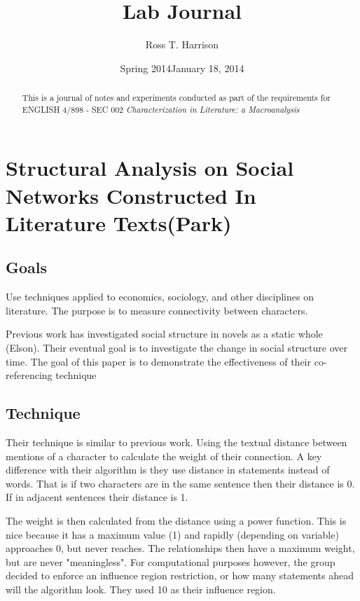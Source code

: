 \documentclass{report}\usepackage[]{graphicx}\usepackage[]{color}
\begin{document}
\author{Ross T. Harrison}
\title{Lab Journal}
\date{Spring 2014}
\maketitle

\begin{abstract}
This is a journal of notes and experiments conducted as part of the requirements for ENGLISH 4/898 - SEC 002 \emph{Characterization in Literature: a Macroanalysis}
\end{abstract}

\section{Structural Analysis on Social Networks Constructed In Literature Texts(Park)}
\date{January 18, 2014}

\subsection{Goals}
Use techniques applied to economics, sociology, and other disciplines on literature. The purpose is to measure connectivity between characters.

Previous work has investigated social structure in novels as a static whole (Elson). Their eventual goal is to investigate the change in social structure over time. The goal of this paper is to demonstrate the effectiveness of their co-referencing technique

\subsection{Technique}
Their technique is similar to previous work. Using the textual distance between mentions of a character to calculate the weight of their connection. A key difference with their algorithm is they use distance in statements instead of words. That is if two characters are in the same sentence then their distance is 0. If in adjacent sentences their distance is 1.

The weight is then calculated from the distance using a power function. This is nice because it has a maximum value (1) and rapidly (depending on variable) approaches 0, but never reaches. The relationships then have a maximum weight, but are never "meaningless". For computational purposes however, the group decided to enforce an influence region restriction, or how many statements ahead will the algorithm look. They used 10 as their influence region.
\end{document}
